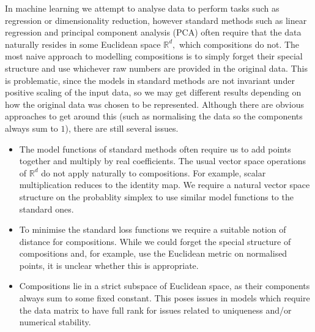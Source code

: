 \documentclass[BSc]{usydthesis}
\numberwithin{equation}{chapter}
\theoremstyle{remark}
\begin{document}
In machine learning we attempt to analyse data to perform tasks such as regression or dimensionality reduction, however standard methods such as linear regression and principal component analysis (PCA) often require that the data naturally resides in some Euclidean space $\mathbb{R}^d,$ which compositions do not. The most naive approach to modelling compositions is to simply forget their special structure and use whichever raw numbers are provided in the original data. This is problematic, since the models in standard methods are not invariant under positive scaling of the input data, so we may get different results depending on how the original data was chosen to be represented. Although there are obvious approaches to get around this (such as normalising the data so the components always sum to $1$), there are still several issues.\\

 \begin{itemize}
  \item The model functions of standard methods often require us to add points together and multiply by real coefficients. The usual vector space operations of $\mathbb{R}^d$ do not apply naturally to compositions. For example, scalar multiplication reduces to the identity map. We require a natural vector space structure on the probablity simplex to use similar model functions to the standard ones.\\
 \item To minimise the standard loss functions we require a suitable notion of distance for compositions. While we could forget the special structure of compositions and, for example, use the Euclidean metric on normalised points, it is unclear whether this is appropriate.\\
  \item Compositions lie in a strict subspace of Euclidean space, as their components always sum to some fixed constant. This poses issues in models which require the data matrix to have full rank for issues related to uniqueness and/or numerical stability.\\ 
 \end{itemize}
 
\end{document}
